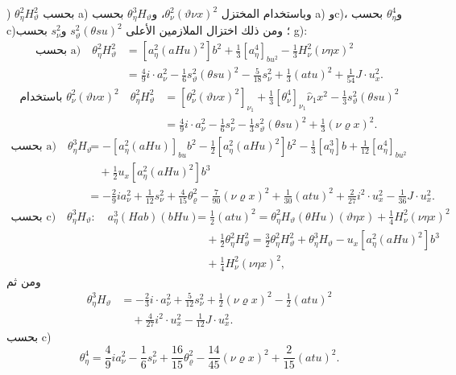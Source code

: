 \documentclass[11pt]{article}
\begin{document}
) $\theta_\eta^2H_\vartheta^2$ بحسب a) وباستخدام المختزل $\theta_\nu^2(\vartheta\nu x)^2$، و$\theta_\eta^3H_\vartheta$ بحسب a) وc)، و$\theta_\eta^4$ بحسب c)؛ ومن ذلك اختزال الملازمين الأعلى $s_\vartheta^2(\theta su)^2$ و$s_\nu^2$ بحسب g):
\[
\begin{aligned}
\text{بحسب a)}\quad
\theta_\eta^2H_\vartheta^2&=[a_\eta^2(aHu)^2]b^2+\frac13[a_\eta^4]_{bu^2}-\frac13H_\nu^2(\nu\eta x)^2\\
&=\frac49i\cdot a_\nu^2-\frac16s_\vartheta^2(\theta su)^2-\frac5{18}s_\nu^2+\frac13(atu)^2+\frac1{54}J\cdot u_x^2.
\end{aligned}
\]
\[
\begin{aligned}
\text{باستخدام }\theta_\nu^2(\vartheta\nu x)^2\quad
\theta_\eta^2H_\vartheta^2
&=[\theta_\nu^2(\vartheta\nu x)^2]_{\nu_1}+\frac13[\theta_\nu^4]_{\nu_1}\widehat{\nu}_1x^2-\frac13s_\vartheta^2(\theta su)^2\\
&=\frac49i\cdot a_\nu^2-\frac16s_\nu^2-\frac13s_\vartheta^2(\theta su)^2+\frac13(\nu\varrho x)^2.
\end{aligned}
\]
\[
\begin{aligned}
\text{بحسب a)}\quad
\theta_\eta^3H_\vartheta&=-[a_\eta^2(aHu)]_{bu}b^2-\frac12[a_\eta^2(aHu)^2]b^2-\frac13[a_\eta^3]b+\frac1{12}[a_\eta^4]_{bu^2}\\
&\quad+\frac12u_x[a_\eta^2(aHu)^2]b^3\\
&=-\frac29ia_\nu^2+\frac1{12}s_\nu^2+\frac4{15}\theta_\varrho^2-\frac7{90}(\nu\varrho x)^2+\frac1{30}(atu)^2+\frac2{27}i^2\cdot u_x^2-\frac1{36}J\cdot u_x^2.
\end{aligned}
\]
\[
\begin{aligned}
\text{بحسب c)}\quad
\theta_\eta^3H_\vartheta:\quad a_\eta^3(Hab)(bHu)&=\frac12(atu)^2
=\theta_\eta^2H_\vartheta(\theta Hu)(\vartheta\eta x)+\frac14H_\nu^2(\nu\eta x)^2\\
&\quad+\frac12\theta_\eta^2H_\vartheta^2
=\frac32\theta_\eta^2H_\vartheta^2+\theta_\eta^3H_\vartheta-u_x[a_\eta^2(aHu)^2]b^3\\
&\quad+\frac14H_\nu^2(\nu\eta x)^2,
\end{aligned}
\]
ومن ثم
\[
\begin{aligned}
\theta_\eta^3H_\vartheta&=-\frac23i\cdot a_\nu^2+\frac5{12}s_\nu^2+\frac12(\nu\varrho x)^2-\frac12(atu)^2\\
&\quad+\frac4{27}i^2\cdot u_x^2-\frac1{12}J\cdot u_x^2.
\end{aligned}
\]
بحسب c)
\[
\theta_\eta^4=\frac49ia_\nu^2-\frac16s_\nu^2+\frac{16}{15}\theta_\varrho^2-\frac{14}{45}(\nu\varrho x)^2+\frac2{15}(atu)^2.
\]
\end{document}
